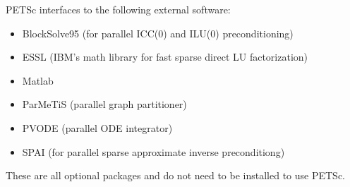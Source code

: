 \vspace{.3in}
\noindent
PETSc interfaces to the following external software:
\begin{itemize}
  \item BlockSolve95 (for parallel ICC(0) and ILU(0) preconditioning)
  \item ESSL         (IBM's math library for fast sparse direct LU factorization)
  \item Matlab       
  \item ParMeTiS      (parallel graph partitioner)
  \item PVODE        (parallel ODE integrator)
  \item SPAI         (for parallel sparse approximate inverse preconditiong)
\end{itemize}
These are all optional packages and do not need to be installed to use PETSc.


